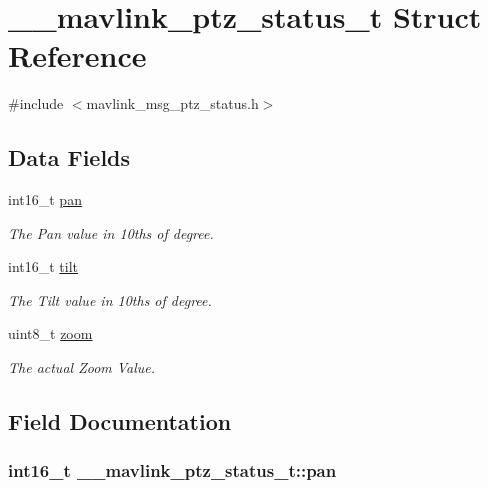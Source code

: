\hypertarget{struct____mavlink__ptz__status__t}{\section{\+\_\+\+\_\+mavlink\+\_\+ptz\+\_\+status\+\_\+t Struct Reference}
\label{struct____mavlink__ptz__status__t}
}


{\ttfamily \#include $<$mavlink\+\_\+msg\+\_\+ptz\+\_\+status.\+h$>$}

\subsection*{Data Fields}
\begin{DoxyCompactItemize}
\item 
int16\+\_\+t \hyperlink{struct____mavlink__ptz__status__t_a3e1444ae7153653f0ec71290cf5aa047}{pan}
\begin{DoxyCompactList}\small\item\em The Pan value in 10ths of degree. \end{DoxyCompactList}\item 
int16\+\_\+t \hyperlink{struct____mavlink__ptz__status__t_a8cceaab78b9d7e937d2601ec69ab154f}{tilt}
\begin{DoxyCompactList}\small\item\em The Tilt value in 10ths of degree. \end{DoxyCompactList}\item 
uint8\+\_\+t \hyperlink{struct____mavlink__ptz__status__t_af4284c7d39478dccf4ad13d1cdd05954}{zoom}
\begin{DoxyCompactList}\small\item\em The actual Zoom Value. \end{DoxyCompactList}\end{DoxyCompactItemize}


\subsection{Field Documentation}
\hypertarget{struct____mavlink__ptz__status__t_a3e1444ae7153653f0ec71290cf5aa047}{
\subsubsection[{pan}]{\setlength{\rightskip}{0pt plus 5cm}int16\+\_\+t \+\_\+\+\_\+mavlink\+\_\+ptz\+\_\+status\+\_\+t\+::pan}}\label{struct____mavlink__ptz__status__t_a3e1444ae7153653f0ec71290cf5aa047}



